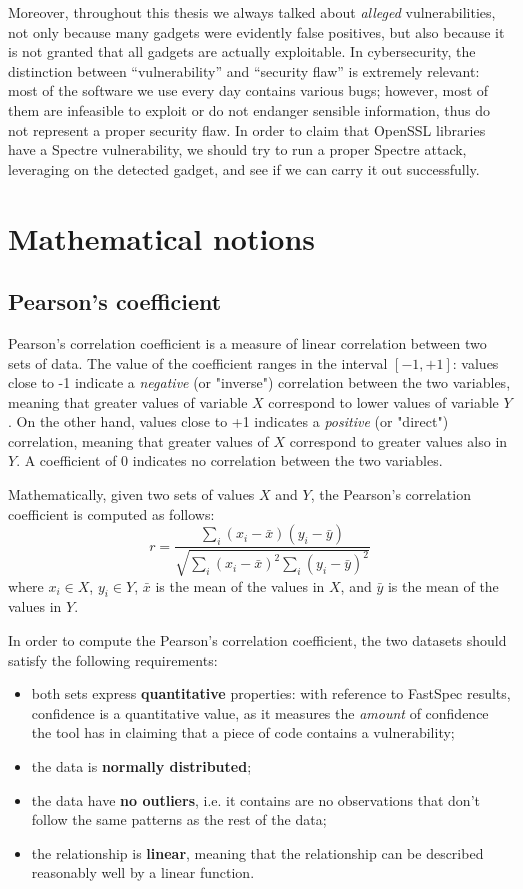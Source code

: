 \documentclass[target=mst,aauheader=aics]{thud}
\theoremstyle{definition}
\begin{document}
Moreover, throughout this thesis we always talked about \textit{alleged} vulnerabilities, not only because many gadgets were evidently false positives, but also because it is not granted that all gadgets are actually exploitable. In cybersecurity, the distinction between ``vulnerability'' and ``security flaw'' is extremely relevant: most of the software we use every day contains various bugs; however, most of them are infeasible to exploit or do not endanger sensible information, thus do not represent a proper security flaw. In order to claim that OpenSSL libraries have a Spectre vulnerability, we should try to run a proper Spectre attack, leveraging on the detected gadget, and see if we can carry it out successfully.

\appendix

\chapter{Mathematical notions}\label{appendix:maths}
\section{Pearson's coefficient}
Pearson's correlation coefficient \cite{Pearson1895} is a measure of linear correlation between two sets of data. The value of the coefficient ranges in the interval $[-1,+1]$: values close to -1 indicate a \textit{negative} (or "inverse") correlation between the two variables, meaning that greater values of variable $X$ correspond to lower values of variable $Y$. On the other hand, values close to +1 indicates a \textit{positive} (or "direct") correlation, meaning that greater values of $X$ correspond to greater values also in $Y$. A coefficient of 0 indicates no correlation between the two variables.	

Mathematically, given two sets of values $X$ and $Y$, the Pearson's correlation coefficient is computed as follows:
\[
r = \frac{\sum_i(x_i-\bar{x})(y_i-\bar{y})}{\sqrt{\sum_i(x_i-\bar{x})^2\sum_i(y_i-\bar{y})^2}}
\]
where $x_i\in X$, $y_i\in Y$, $\bar{x}$ is the mean of the values in $X$, and $\bar{y}$ is the mean of the values in $Y$. 

In order to compute the Pearson's correlation coefficient, the two datasets should satisfy the following requirements:
\begin{itemize}
	\item both sets express \textbf{quantitative} properties: with reference to FastSpec results, confidence is a quantitative value, as it measures the \textit{amount} of confidence the tool has in claiming that a piece of code contains a vulnerability;
	\item the data is \textbf{normally distributed};
	\item the data have \textbf{no outliers}, i.e. it contains are no observations that don’t follow the same patterns as the rest of the data;
	\item the relationship is \textbf{linear}, meaning that the relationship can be described reasonably well by a linear function.
\end{itemize}
\end{document}

